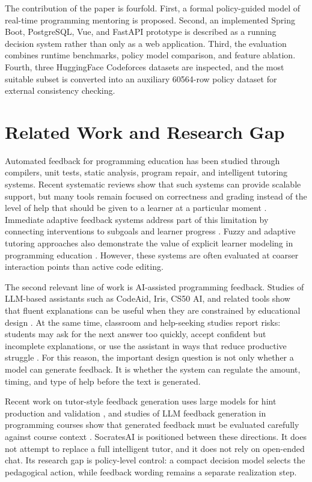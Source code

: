 \documentclass[twoside, 11pt]{article}
\begin{document}
The contribution of the paper is fourfold. First, a formal policy-guided model of real-time programming mentoring is proposed. Second, an implemented Spring Boot, PostgreSQL, Vue, and FastAPI prototype is described as a running decision system rather than only as a web application. Third, the evaluation combines runtime benchmarks, policy model comparison, and feature ablation. Fourth, three HuggingFace Codeforces datasets are inspected, and the most suitable subset is converted into an auxiliary 60564-row policy dataset for external consistency checking.

\section{\large Related Work and Research Gap}

Automated feedback for programming education has been studied through compilers, unit tests, static analysis, program repair, and intelligent tutoring systems. Recent systematic reviews show that such systems can provide scalable support, but many tools remain focused on correctness and grading instead of the level of help that should be given to a learner at a particular moment \cite{messer2024,kumar2025}. Immediate adaptive feedback systems address part of this limitation by connecting interventions to subgoals and learner progress \cite{marwan2022}. Fuzzy and adaptive tutoring approaches also demonstrate the value of explicit learner modeling in programming education \cite{chrysafiadi2023}. However, these systems are often evaluated at coarser interaction points than active code editing.

The second relevant line of work is AI-assisted programming feedback. Studies of LLM-based assistants such as CodeAid, Iris, CS50 AI, and related tools show that fluent explanations can be useful when they are constrained by educational design \cite{denny2024,kazemitabaar2024,bassner2024,liu2025}. At the same time, classroom and help-seeking studies report risks: students may ask for the next answer too quickly, accept confident but incomplete explanations, or use the assistant in ways that reduce productive struggle \cite{sheese2024,ahmed2025}. For this reason, the important design question is not only whether a model can generate feedback. It is whether the system can regulate the amount, timing, and type of help before the text is generated.

Recent work on tutor-style feedback generation uses large models for hint production and validation \cite{phung2024}, and studies of LLM feedback generation in programming courses show that generated feedback must be evaluated carefully against course context \cite{estevez2025,pankiewicz2023}. SocratesAI is positioned between these directions. It does not attempt to replace a full intelligent tutor, and it does not rely on open-ended chat. Its research gap is policy-level control: a compact decision model selects the pedagogical action, while feedback wording remains a separate realization step.
\end{document}
